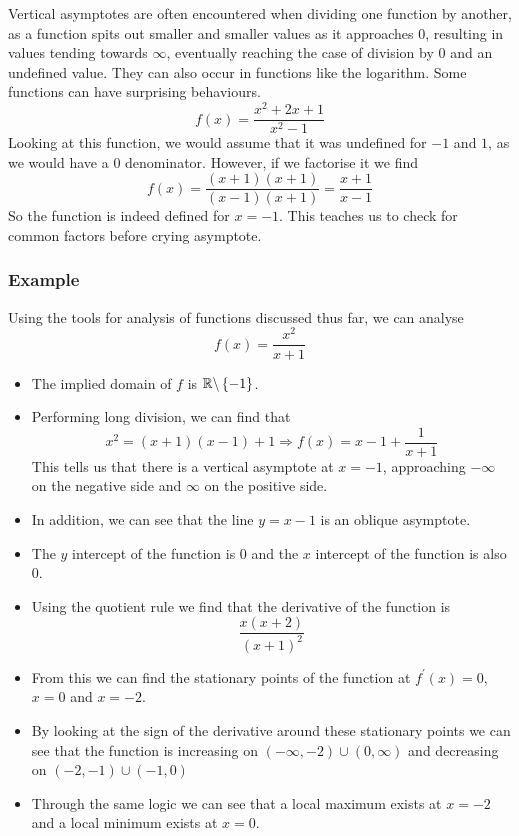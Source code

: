\documentclass[12pt]{report}
\newcommand{\R}{\mathbb{R}}
\begin{document}
\begin{flushleft}
\bigskip
Vertical asymptotes are often encountered when dividing one function by 
another, as a function spits out smaller and smaller values as it approaches
\(0\), resulting in values tending towards \(\infty\), eventually reaching
the case of division by \(0\) and an undefined value. They can also occur
in functions like the logarithm. Some functions can have surprising behaviours.
\[f(x) = \frac{x^2 + 2x + 1}{x^2 - 1}\]
Looking at this function, we would assume that it was undefined for \(-1\) and
\(1\), as we would have a \(0\) denominator. However, if we factorise it we
find
\[f(x) = \frac{(x + 1)(x + 1)}{(x - 1)(x + 1)} = \frac{x + 1}{x - 1}\]
So the function is indeed defined for \(x = -1\). This teaches us to check
for common factors before crying asymptote.

\subsubsection*{Example}
Using the tools for analysis of functions discussed thus far, we can analyse
\[f(x) = \frac{x^2}{x + 1}\]
\begin{itemize}
    \item The implied domain of \(f\) is \(\R \backslash \set{-1}\).
    \item Performing long division, we can find that 
    \[x^2 = (x+1)(x-1)+1 \Rightarrow f(x) = x-1 + \frac{1}{x+1}\]
    This tells us that there is a vertical asymptote at \(x = -1\), approaching
    \(-\infty\) on the negative side and \(\infty\) on the positive side.
    \item In addition, we can see that the line \(y = x - 1\) is an oblique
    asymptote.
    \item The \(y\) intercept of the function is \(0\) and the \(x\) intercept
    of the function is also \(0\).
    \item Using the quotient rule we find that the derivative of the function
    is \[\frac{x(x + 2)}{(x + 1)^2}\]
    \item From this we can find the stationary points of the function at
    \(f^\prime(x) = 0\), \(x = 0\) and \(x = -2\).
    \item By looking at the sign of the derivative around these stationary 
    points we can see that the function is increasing on 
    \((-\infty, -2) \cup (0, \infty)\) and decreasing on 
    \((-2, -1) \cup (-1, 0)\)
    \item Through the same logic we can see that a local maximum exists at 
    \(x = -2\) and a local minimum exists at \(x = 0\).

\end{itemize}
\end{flushleft}
\end{document}
